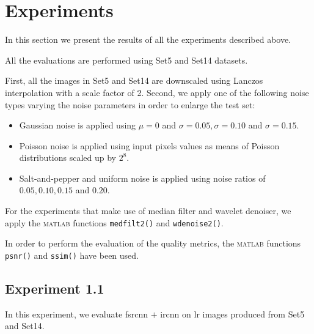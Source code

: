 \section{Experiments}\label{sec:experiments}
In this section we present the results of all the experiments described above. 

All the evaluations are performed using Set5 \cite{SET5} and Set14 \cite{SET14} datasets.

First, all the images in Set5 and Set14 are downscaled using Lanczos interpolation with a scale factor of 2. Second, we apply one of the following noise types varying the noise parameters in order to enlarge the test set:
\begin{itemize}
	\item Gaussian noise is applied using $\mu=0$ and $\sigma = 0.05, \sigma = 0.10$ and $\sigma = 0.15$.
	\item Poisson noise is applied using input pixels values as means of Poisson distributions scaled up by $2^8$.
	\item Salt-and-pepper and uniform noise is applied using noise ratios of $0.05, 0.10, 0.15$ and $0.20$.
\end{itemize}

For the experiments that make use of median filter and wavelet denoiser, we apply the \textsc{matlab} functions \texttt{medfilt2()} and \texttt{wdenoise2()}.

In order to perform the evaluation of the quality metrics, the \textsc{matlab} functions \texttt{psnr()} and \texttt{ssim()} have been used.

\subsection{Experiment 1.1}
In this experiment, we evaluate \gls{fsrcnn} $+$ \gls{ircnn} on \gls{lr} images produced from Set5 and Set14.


